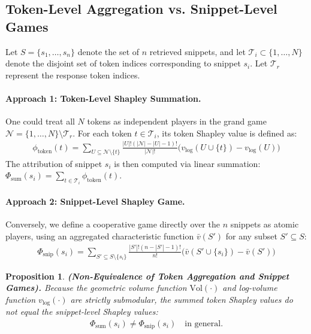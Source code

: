 \documentclass{article}
\newtheorem{proposition}{Proposition}
\begin{document}
\subsection{Token-Level Aggregation vs. Snippet-Level Games}

Let $S = \{s_1, \dots, s_n\}$ denote the set of $n$ retrieved snippets, and let $\mathcal{T}_i \subset \{1, \dots, N\}$ denote the disjoint set of token indices corresponding to snippet $s_i$. Let $\mathcal{T}_r$ represent the response token indices.

\paragraph{Approach 1: Token-Level Shapley Summation.} 
One could treat all $N$ tokens as independent players in the grand game $\mathcal{N} = \{1, \dots, N\} \setminus \mathcal{T}_r$. For each token $t \in \mathcal{T}_i$, its token Shapley value is defined as:
\begin{align}
    \phi_{\text{token}}(t) = \sum_{U \subseteq \mathcal{N} \setminus \{t\}} \frac{|U|!(|\mathcal{N}| - |U| - 1)!}{|\mathcal{N}|!} \Big( v_{\log}(U \cup \{t\}) - v_{\log}(U) \Big)
\end{align}
The attribution of snippet $s_i$ is then computed via linear summation: $\Phi_{\text{sum}}(s_i) = \sum_{t \in \mathcal{T}_i} \phi_{\text{token}}(t)$.

\paragraph{Approach 2: Snippet-Level Shapley Game.} 
Conversely, we define a cooperative game directly over the $n$ snippets as atomic players, using an aggregated characteristic function $\bar{v}(S')$ for any subset $S' \subseteq S$:
\begin{align}
    \Phi_{\text{snip}}(s_i) = \sum_{S' \subseteq S \setminus \{s_i\}} \frac{|S'|!(n - |S'| - 1)!}{n!} \Big( \bar{v}(S' \cup \{s_i\}) - \bar{v}(S') \Big)
\end{align}

\begin{proposition}\label{prop:non_equivalence}
\textbf{(Non-Equivalence of Token Aggregation and Snippet Games).}
Because the geometric volume function $\text{Vol}(\cdot)$ and log-volume function $v_{\log}(\cdot)$ are strictly submodular, the summed token Shapley values do not equal the snippet-level Shapley values:
\begin{align}
    \Phi_{\text{sum}}(s_i) \neq \Phi_{\text{snip}}(s_i) \quad \text{in general.}
\end{align}
\end{proposition}
\end{document}
